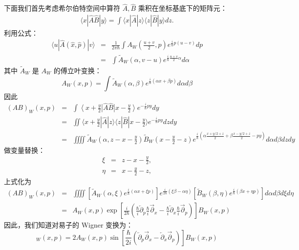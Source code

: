 \documentclass[10pt,UTF8]{ctexart}
\begin{document}
下面我们首先考虑希尔伯特空间中算符 $\hat A,\hat B$ 乘积在坐标基底下的矩阵元：
\begin{eqnarray}
	\langle x|\hat A \hat B|y\rangle
	= \int \langle x|\hat A|z\rangle \langle z| \hat B|y\rangle dz.
\end{eqnarray}
利用公式：
\begin{eqnarray}
	\langle u| \hat A(\hat x,\hat p) |v\rangle
	&=& \frac{1}{2\pi \hbar} \int A_W\left(\frac{u+v}{2},p\right) e^{\frac{i}{\hbar}p(u-v)} dp \nonumber \\
	&=& \int \tilde{A}_W(\alpha,v-u)e^{\frac{i}{\hbar}\frac{u+v}{2}\alpha} d\alpha
\end{eqnarray}
其中 $\tilde A_W$ 是 $A_W$ 的傅立叶变换：
\begin{equation}
	A_W(x,p) = \int \tilde A_W(\alpha,\beta) e^{\frac{i}{\hbar}(\alpha x+\beta p)}d\alpha d\beta
\end{equation}
因此
\begin{eqnarray}
	(AB)_W(x,p) 
	&=& \int \left\langle x+\frac{y}{2}\right|\hat A \hat B \left|x-\frac{y}{2}\right\rangle e^{-\frac{i}{\hbar}py}dy \nonumber \\
	&=& \iint \langle x+\frac{y}{2}|\hat A |z\rangle \langle z| \hat B |x-\frac{y}{2}\rangle e^{-\frac{i}{\hbar}py} dz dy \nonumber \\
	&=& \iiiint \tilde{A}_W\left(\alpha,z-x-\frac{y}{2}\right) \tilde{B}_W\left(x-\frac{y}{2}-z\right) e^{\frac{i}{\hbar}\left(\alpha\frac{x+y/2+z}{2}+\beta\frac{x-y/2+z}{2}-py\right)} d\alpha d\beta dz dy
\end{eqnarray}
做变量替换：
\begin{eqnarray}
	\xi &=& z-x-\frac{y}{2}, \\
	\eta &=& x-\frac{y}{2}-z,
\end{eqnarray}
上式化为
\begin{eqnarray}
	(AB)_W(x,p) &=& \iiiint \left[\tilde A_W(\alpha,\xi) e^{\frac{i}{\hbar}(\alpha x+\xi p)}\right] e^{\frac{i}{2\hbar}(\xi \beta - \alpha \eta)}\left[ \tilde B_W(\beta,\eta)e^{\frac{i}{\hbar}(\beta x+\eta p)} \right] d\alpha d\beta d\xi d\eta \nonumber \\
	&=& A_W(x,p) \exp\left[\frac{i}{2\hbar}\left(\frac{\hbar}{i}\overleftarrow{\partial}_p \frac{\hbar}{i}\overrightarrow{\partial}_x - \frac{\hbar}{i}\overleftarrow{\partial}_x \frac{\hbar}{i}\overrightarrow{\partial}_p\right)\right]B_W(x,p)
\end{eqnarray}
因此，我们知道对易子的 Wigner 变换为：
\begin{equation}
	[A,B]_W(x,p) = 2 A_W(x,p) \sin\left[\frac{\hbar}{2i}(\overleftarrow{\partial}_p\overrightarrow{\partial}_x-\overleftarrow{\partial}_x\overrightarrow{\partial}_p)\right] B_W(x,p)
\end{equation}
\end{document}
